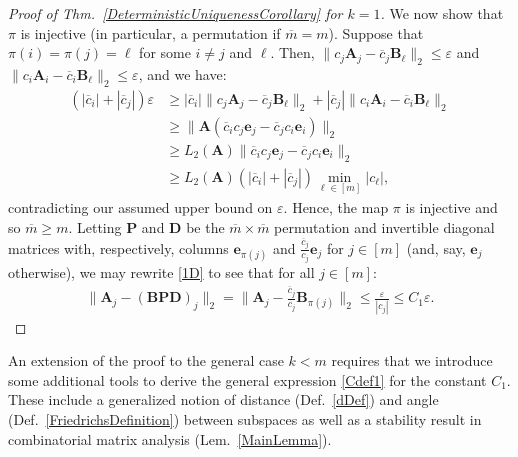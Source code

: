\documentclass[journal, twocolumn]{IEEEtran}
\begin{document}
\begin{proof}[Proof of Thm.~\ref{DeterministicUniquenessCorollary} for $k=1$]
We now show that $\pi$ is injective (in particular, a permutation if $\overline m = m$). Suppose that $\pi(i) = \pi(j) = \ell$ for some $i \neq j$ and $\ell$. Then, $\|c_{j}\mathbf{A}_{j} - \overline{c}_{j}\mathbf{B}_{\ell}\|_2 \leq \varepsilon$ and $\|c_{i}\mathbf{A}_{i} - \overline{c}_{i} \mathbf{B}_{\ell}\|_2  \leq \varepsilon$, and we have: %
\begin{align*}
(|\overline{c}_{i}| + |\overline{c}_{j}|) \varepsilon
&\geq |\overline{c}_{i}| \|c_{j}\mathbf{A}_{j} - \overline{c}_{j}\mathbf{B}_{\ell}\|_2  + |\overline{c}_{j}| \|c_{i}\mathbf{A}_{i} - \overline{c}_{i} \mathbf{B}_{\ell}\|_2 \nonumber \\
&\geq \|\mathbf{A}(\overline{c}_{i}c_{j} \mathbf{e}_{j} - \overline{c}_{j}c_{i}\mathbf{e}_{i})\|_2 \nonumber \\ 
&\geq  L_2(\mathbf{A}) \|\overline{c}_{i}c_{j} \mathbf{e}_{j} - \overline{c}_{j}c_{i}\mathbf{e}_{i}\|_2 \nonumber \\
&\geq  L_2(\mathbf{A}) \left( |\overline{c}_{i}| + |\overline{c}_{j}| \right) \min_{\ell \in [m]} |c_\ell |,
\end{align*}
contradicting our assumed upper bound on $\varepsilon$. Hence, the map $\pi$ is injective and so $\overline m \geq m$. %
Letting $\mathbf{P}$ and $\mathbf{D}$ be the $\overline m \times \overline m$ permutation and invertible diagonal matrices with, respectively, columns $\mathbf{e}_{\pi(j)}$ and $\frac{\overline{c}_j}{c_j}\mathbf{e}_j$ for $j \in [m]$ (and, say, $\mathbf{e}_j$ otherwise), we may rewrite \eqref{1D} to see that for all $j \in [m]$:
\begin{align*}
\|\mathbf{A}_j - (\mathbf{BPD})_j\|_2 
= \|\mathbf{A}_j - \frac{\overline{c}_j}{c_j}\mathbf{B}_{\pi(j)}\|_2 
\leq \frac{\varepsilon}{|c_j|} 
\leq C_1\varepsilon.
\end{align*}
\end{proof}

An extension of the proof to the general case $k < m$ requires that we introduce some additional tools to derive the general expression \eqref{Cdef1} for the constant $C_1$. These include a generalized notion of distance (Def.~\ref{dDef}) and angle (Def.~\ref{FriedrichsDefinition}) between subspaces as well as a stability result in combinatorial matrix analysis (Lem.~\ref{MainLemma}). 
\end{document}
